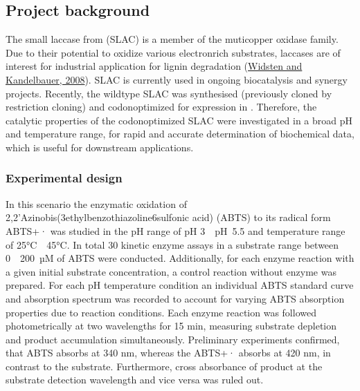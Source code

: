 \documentclass[letterpaper,12pt,english]{jupyterBook}
\begin{document}
\subsection{Project background}
\label{\detokenize{scenarios/SLAC_kinetic_characterization:project-background}}
\sphinxAtStartPar
The small laccase from  (SLAC) is a member of the muticopper oxidase family. Due to their potential to oxidize various electron\sphinxhyphen{}rich substrates, laccases are of interest for industrial application for lignin degradation (\hyperlink{cite.references:id13}{Widsten and Kandelbauer, 2008}). SLAC is currently used in ongoing biocatalysis and synergy projects. Recently, the wild\sphinxhyphen{}type SLAC was synthesised (previously cloned by restriction cloning) and codon\sphinxhyphen{}optimized for expression in . Therefore, the catalytic properties of the codon\sphinxhyphen{}optimized SLAC were investigated in a broad pH and temperature range, for rapid and accurate determination of biochemical data, which is useful for downstream applications.


\subsubsection{Experimental design}
\label{\detokenize{scenarios/SLAC_kinetic_characterization:experimental-design}}
\sphinxAtStartPar
In this scenario the enzymatic oxidation of 2,2’\sphinxhyphen{}Azino\sphinxhyphen{}bis(3\sphinxhyphen{}ethylbenzothiazoline\sphinxhyphen{}6\sphinxhyphen{}sulfonic acid) (ABTS) to its radical form ABTS+· was studied in the pH range of pH 3 \sphinxhyphen{} pH 5.5 and temperature range of 25°C \sphinxhyphen{} 45°C. In total 30 kinetic enzyme assays in a substrate range between 0 \sphinxhyphen{} 200 µM of ABTS were conducted. Additionally, for each enzyme reaction with a given initial substrate concentration, a control reaction without enzyme was prepared. For each pH \sphinxhyphen{} temperature condition an individual ABTS standard curve and absorption spectrum was recorded to account for varying ABTS absorption properties due to reaction conditions. Each enzyme reaction was followed photometrically at two wavelengths for 15 min, measuring substrate depletion and product accumulation simultaneously. Preliminary experiments confirmed, that ABTS absorbs at 340 nm, whereas the ABTS+· absorbs at 420 nm, in contrast to the substrate. Furthermore, cross absorbance of product at the substrate detection wavelength and vice versa was ruled out.
\end{document}
